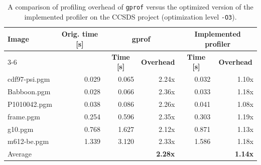 \begin{table}[]
    \centering
    \begin{tabular}{lrrrrr}
     \multicolumn{1}{l}{\multirow{2}{*}{\textbf{Image}}} & \multicolumn{1}{c}{\multirow{2}{*}{\textbf{Orig. time [s]}}} & \multicolumn{2}{c}{\textbf{gprof}} & \multicolumn{2}{c}{\textbf{Implemented profiler}} \\
    \cline{3-6} 
    \multicolumn{1}{l}{} & \multicolumn{1}{c}{} & \multicolumn{1}{c}{\textbf{Time [s]}} & \multicolumn{1}{c}{\textbf{Overhead}} & \multicolumn{1}{c}{\textbf{Time [s]}} & \multicolumn{1}{c}{\textbf{Overhead}} \\ 
    \hline
    \hline
    cdf97-psi.pgm & 0.029 & 0.065 & 2.24x & 0.032 & 1.10x \\
    Babboon.pgm & 0.028 & 0.066 & 2.36x  & 0.033 & 1.18x \\
    P1010042.pgm & 0.038 & 0.086 & 2.26x & 0.041 & 1.08x \\
    frame.pgm & 0.254 & 0.596 & 2.35x & 0.303 & 1.19x \\
    g10.pgm & 0.768 & 1.627 & 2.12x & 0.871 & 1.13x \\
    m612-be.pgm & 1.339 & 3.120 & 2.33x & 1.586 & 1.18x \\
    \hline
    \multicolumn{1}{l}{Average} & & & \textbf{2.28x} & & \textbf{1.14x} \\
    \end{tabular}
    \caption{A comparison of profiling overhead of \texttt{gprof} versus the optimized version of the implemented profiler on the CCSDS project (optimization level \texttt{-O3}).}
    \label{tab:ccsds-gprof}
\end{table}



